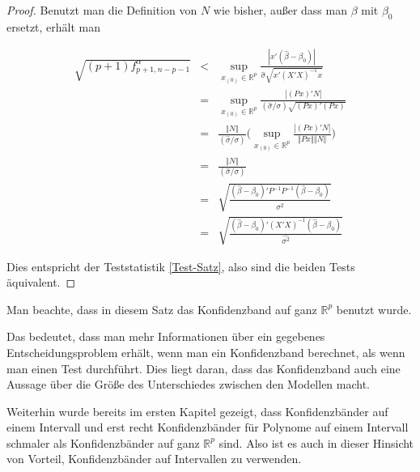 \documentclass[12pt,a4paper]{article}
\theoremstyle{definition}
\theoremstyle{definition}
\theoremstyle{definition}
\theoremstyle{definition}
\begin{document}
\begin{proof}
Benutzt man die Definition von $N$ wie bisher, außer dass man $\beta$ mit $\beta_0$ ersetzt, erhält man

\begin{eqnarray*}
\sqrt{(p+1) f^{\alpha}_{p+1,n-p-1}} &<& \sup_{x_{(0)} \in \mathbb{R}^p} \frac{|x'(\hat{\beta}-\beta_0) |}{\hat{\sigma} \sqrt{x'(X'X)^{-1}x}} \\
&=& \sup_{x_{(0)} \in \mathbb{R}^p} \frac{| (Px)' N |}{(\hat{\sigma}/\sigma) \sqrt{(Px)'(Px)}} \\
&=& \frac{\Vert N \Vert}{(\hat{\sigma}/\sigma)} \Big( \sup_{x_{(0)} \in \mathbb{R}^p} \frac{| (Px)' N |}{\Vert P x \Vert \Vert N \Vert} \Big) \\
&=& \frac{\Vert N \Vert}{(\hat{\sigma}/\sigma)} \\
&=& \sqrt{ \frac{(\hat{\beta}-\beta_0)' P^{-1} P^{-1} (\hat{\beta}-\beta_0)}{\widehat{\sigma^2}} } \\
&=& \sqrt{\frac{(\hat{\beta}-\beta_0)' (X'X)^{-1} (\hat{\beta}-\beta_0)}{\widehat{\sigma^2}}}
\end{eqnarray*}

Dies entspricht der Teststatistik \eqref{Test-Satz}, also sind die beiden Tests äquivalent.
\end{proof}

Man beachte, dass in diesem Satz das Konfidenzband auf ganz $\mathbb{R}^{p}$ benutzt wurde. 

Das bedeutet, dass man mehr Informationen über ein gegebenes Entscheidungsproblem erhält, wenn man ein Konfidenzband berechnet, als wenn man einen Test durchführt. Dies liegt daran, dass das Konfidenzband auch eine Aussage über die Größe des Unterschiedes zwischen den Modellen macht.

Weiterhin wurde bereits im ersten Kapitel gezeigt, dass Konfidenzbänder auf einem Intervall und erst recht Konfidenzbänder für Polynome auf einem Intervall schmaler als Konfidenzbänder auf ganz $\mathbb{R}^{p}$ sind. Also ist es auch in dieser Hinsicht von Vorteil, Konfidenzbänder auf Intervallen zu verwenden.

\end{document}
